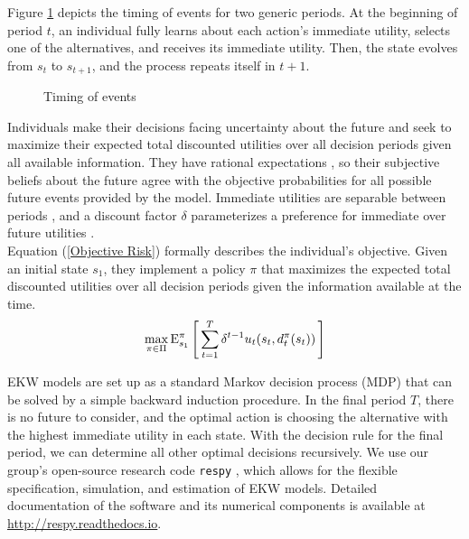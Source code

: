 \noindent Figure \ref{Timing} depicts the timing of events for two generic periods.  At the beginning of period $t$, an individual fully learns about each action's immediate utility, selects one of the alternatives, and receives its immediate utility. Then, the state evolves from $s_t$ to $s_{t + 1}$, and the process repeats itself in $t + 1$.\\

\begin{figure}\centering

\caption{Timing of events}\label{Timing}
\end{figure}

\noindent Individuals make their decisions facing uncertainty about the future and seek to maximize their expected total discounted utilities over all decision periods given all available information. They have rational expectations \citep{Muth.1961}, so their subjective beliefs about the future agree with the objective probabilities for all possible future events provided by the model. Immediate utilities are separable between periods \citep{Kahneman.1997}, and a discount factor $\delta$ parameterizes a preference for immediate over future utilities \citep{Samuelson.1937}.\\

\noindent Equation (\ref{Objective Risk}) formally describes the individual's objective. Given an initial state $s_1$, they implement a policy $\pi$ that maximizes the expected total discounted utilities over all decision periods given the information available at the time.
%
\begin{align}\label{Objective Risk}
\max_{\pi \in \Pi} \mathrm{E}_{s_1}^\pi\left[\,\sum^{T}_{t = 1}  \delta^{t - 1} u_t(s_t, d^\pi_t(s_t))\,\right]
\end{align}

\noindent EKW models are set up as a standard Markov decision process (MDP) \citep{Puterman.1994,Rust.1994,White.1993} that can be solved by a simple backward induction procedure. In the final period $T$, there is no future to consider, and the optimal action is choosing the alternative with the highest immediate utility in each state. With the decision rule for the final period, we can determine all other optimal decisions recursively. We use our group's open-source research code \verb+respy+ \citep{Gabler.2020b}, which allows for the flexible specification, simulation, and estimation of EKW models. Detailed documentation of the software and its numerical components is available at \url{http://respy.readthedocs.io}.
